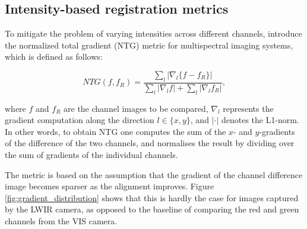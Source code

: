 \documentclass{l4proj}
\begin{document}
\subsection{Intensity-based registration metrics}

To mitigate the problem of varying intensities across different channels, \citet{chen_normalized_2018} introduce the normalized total gradient (NTG) metric for multispectral imaging systems, which is defined as follows:

\begin{equation}
  NTG(f, f_R) = \frac{\sum_l |\nabla_l \{f - f_R\}|}{\sum_l | \nabla_l f | + \sum_l | \nabla_l f_R|},
\end{equation}

where $f$ and $f_R$ are the channel images to be compared, $\nabla_l$ represents the gradient computation along the direction $l \in \{x, y\}$, and $| \cdot |$ denotes the L1-norm. In other words, to obtain NTG one computes the sum of the $x$- and $y$-gradients of the difference of the two channels, and normalises the result by dividing over the sum of gradients of the individual channels.

The metric is based on the assumption that the gradient of the channel difference image becomes sparser as the alignment improves. Figure \ref{fig:gradient_distribution} shows that this is hardly the case for images captured by the LWIR camera, as opposed to the baseline of comparing the red and green channels from the VIS camera.
\end{document}
